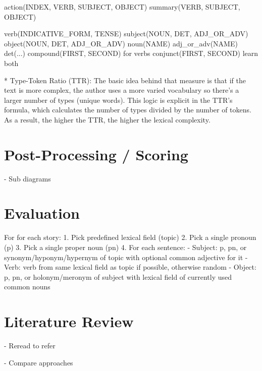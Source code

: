 \documentclass[12pt,twoside]{report}
\theoremstyle{definition}
\begin{document}
action(INDEX, VERB, SUBJECT, OBJECT)
summary(VERB, SUBJECT, OBJECT)

verb(INDICATIVE\_FORM, TENSE)
subject(NOUN, DET, ADJ\_OR\_ADV)
object(NOUN, DET, ADJ\_OR\_ADV)
noun(NAME)
adj\_or\_adv(NAME)
det(...)
compound(FIRST, SECOND)  for verbs
conjunct(FIRST, SECOND)  learn both

* Type-Token Ratio (TTR): The basic idea behind that measure is that if the text is more complex, the author uses a more varied vocabulary so there’s a larger number of types (unique words). This logic is explicit in the TTR’s formula, which calculates the number of types divided by the number of tokens. As a result, the higher the TTR, the higher the lexical complexity.

\chapter{Post-Processing / Scoring}


- Sub diagrams

\chapter{Evaluation}


For for each story:
1. Pick predefined lexical field (topic)
2. Pick a single pronoun (p)
3. Pick a single proper noun (pn)
4. For each sentence:
    - Subject: p, pn, or synonym/hyponym/hypernym of topic with optional common adjective for it
    - Verb: verb from same lexical field as topic if possible, otherwise random
    - Object: p, pn, or holonym/meronym of subject with lexical field of currently used common nouns

\chapter{Literature Review}

- Reread to refer

- Compare approaches

\begin{appendices}


\end{appendices}



\pagestyle{PageNum}
\end{document}
